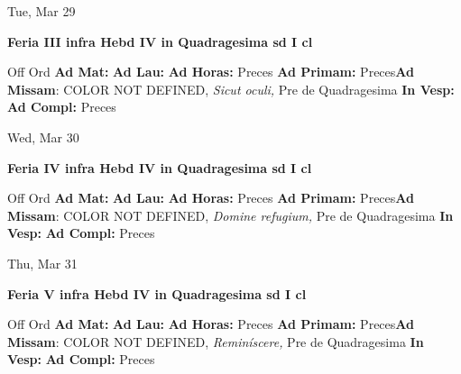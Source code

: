 \documentclass[10pt]{memoir}
\begin{document}
\begin{center}
\begin{minipage}{3.5in}
\vspace{2em}
\begin{center}Tue, Mar 29
\end{center}
\textbf{ \large Feria III infra Hebd IV in Quadragesima 
\textnormal{\normalsize sd I cl}}

\begin{justify}Off Ord
\textbf{Ad Mat: }
\textbf{Ad Lau: }
\textbf{Ad Horas: }Preces
\textbf{Ad Primam: }Preces\textbf{Ad Missam}: COLOR NOT DEFINED, \textit{Sicut oculi,} Pre de Quadragesima
\textbf{In Vesp: }
\textbf{Ad Compl: }Preces
\end{justify}
\end{minipage}
\end{center}

\begin{center}
\begin{minipage}{3.5in}
\vspace{2em}
\begin{center}Wed, Mar 30
\end{center}
\textbf{ \large Feria IV infra Hebd IV in Quadragesima 
\textnormal{\normalsize sd I cl}}

\begin{justify}Off Ord
\textbf{Ad Mat: }
\textbf{Ad Lau: }
\textbf{Ad Horas: }Preces
\textbf{Ad Primam: }Preces\textbf{Ad Missam}: COLOR NOT DEFINED, \textit{Domine refugium,} Pre de Quadragesima
\textbf{In Vesp: }
\textbf{Ad Compl: }Preces
\end{justify}
\end{minipage}
\end{center}

\begin{center}
\begin{minipage}{3.5in}
\vspace{2em}
\begin{center}Thu, Mar 31
\end{center}
\textbf{ \large Feria V infra Hebd IV in Quadragesima 
\textnormal{\normalsize sd I cl}}

\begin{justify}Off Ord
\textbf{Ad Mat: }
\textbf{Ad Lau: }
\textbf{Ad Horas: }Preces
\textbf{Ad Primam: }Preces\textbf{Ad Missam}: COLOR NOT DEFINED, \textit{Reminíscere,} Pre de Quadragesima
\textbf{In Vesp: }
\textbf{Ad Compl: }Preces
\end{justify}
\end{minipage}
\end{center}
\end{document}
